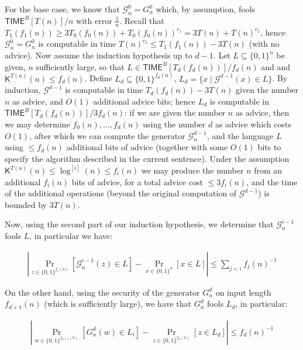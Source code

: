 For the base case, we know that $\mathcal{G}^{0}_{n}=G^{0}_{n}$ which, by assumption, fools ${\mathsf{TIME}}^{B}[T(n)]/n$ with error $\frac{1}{n}$. Recall that $T_{1}(f_{1}(n))\geq 3T_{0}(f_{0}(n))+T_{0}(f_{0}(n))^{c_{1}}=3T(n)+T(n)^{c_{1}}$, hence $\mathcal{G}^{0}_{n}=G^{0}_{n}$ is computable in time $T(n)^{c_{1}}\leq T_{1}(f_{1}(n))-3T(n)$ (with no advice).
Now assume the induction hypothesis up to $d-1$. Let $L\subseteq\{0,1\}^{n}$ be given, $n$ sufficiently large, so that $L\in{\mathsf{TIME}}^{B}[T_{d}(f_{d}(n))]/f_{d}(n)$ and and ${\mathsf{K}}^{T(n)}(n)\leq f_{d}(n)$.
Define $L_{d}\subseteq\{0,1\}^{f_{d}(n)}$, $L_{d}=\{x\mid\mathcal{G}^{d-1}(x)\in L\}$. By induction, $\mathcal{G}^{d-1}$ is computable in time $T_{d}(f_{d}(n))-3T(n)$ given the number $n$ as advice, and $O(1)$ additional advice bits; hence $L_{d}$ is computable in ${\mathsf{TIME}}^{B}[T_{d}(f_{d}(n))]/3f_{d}(n)$: if we are given the number $n$ as advice, then we may determine $f_{0}(n),\ldots,f_{d}(n)$ using the number $d$ as advice which costs $O(1)$, after which we can compute the generator $\mathcal{G}^{d-1}_{n}$, and the language $L$ using $\leq f_{d}(n)$ additional bits of advice (together with some $O(1)$ bits to specify the algorithm described in the current sentence). Under the assumption ${\mathsf{K}}^{T(n)}(n)\leq\log^{[i]}(n)\leq f_{i}(n)$ we may produce the number $n$ from an additional $f_{i}(n)$ bits of advice, for a total advice cost $\leq 3f_{i}(n)$, and the time of the additional operations (beyond the original computation of $\mathcal{G}^{d-1}$) is bounded by $3T(n)$.\par




Now, using the second part of our induction hypothesis, we determine that $\mathcal{G}_{n}^{i-1}$ fools $L$, in particular we have:\par


\[\begin{gathered}
|\Pr_{z\in\{0,1\}^{f_{i}(n)}}[\mathcal{G}^{i-1}_{n}(z)\in L]-\Pr_{x\in\{0,1\}^{n}}[x\in L]|\leq\sum_{j<i}f_{j}(n)^{-1}
\end{gathered}\]


On the other hand, using the security of the generator $G^{d}_{n}$ on input length $f_{d+1}(n)$ (which is sufficiently large), we have that $G^{d}_{n}$ fools $L_{d}$, in particular:\par


\[\begin{gathered}
|\Pr_{w\in\{0,1\}^{f_{d+1}(n)}}[G^{d}_{n}(w)\in L_{i}]-\Pr_{z\in\{0,1\}^{f_{d}(n)}}[z\in L_{d}]|\leq f_{d}(n)^{-1}
\end{gathered}\]


